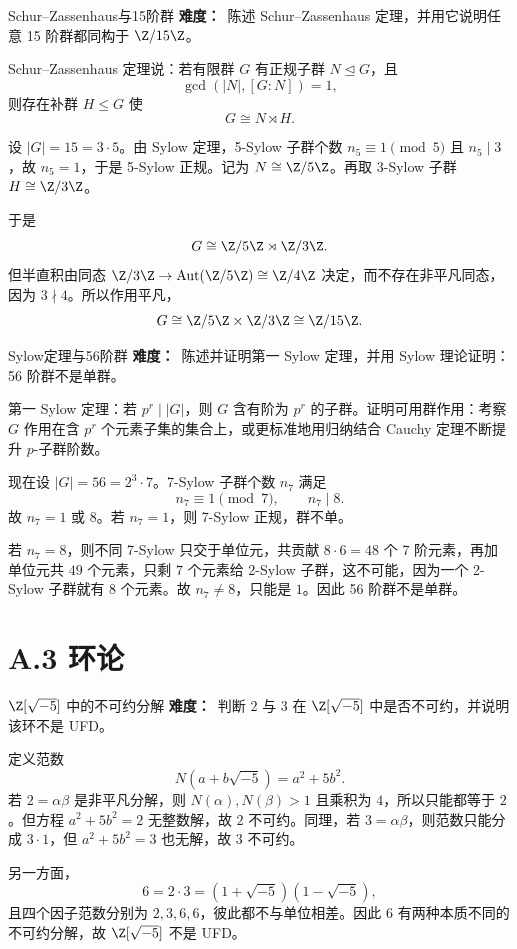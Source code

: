 \begin{problem}{Schur--Zassenhaus与15阶群}
\textbf{难度：}\hard\ 陈述 Schur--Zassenhaus 定理，并用它说明任意 15 阶群都同构于 $\Z/15\Z$。
\end{problem}
\begin{solution}
Schur--Zassenhaus 定理说：若有限群 $G$ 有正规子群 $N\trianglelefteq G$，且
\[
\gcd(|N|,[G:N])=1,
\]
则存在补群 $H\le G$ 使
\[
G\cong N\rtimes H.
\]

设 $|G|=15=3\cdot5$。由 Sylow 定理，5-Sylow 子群个数 $n_5\equiv1\pmod5$ 且 $n_5\mid3$，故 $n_5=1$，于是 5-Sylow 正规。记为 $N\cong\Z/5\Z$。再取 3-Sylow 子群 $H\cong\Z/3\Z$。

于是
\[
G\cong \Z/5\Z\rtimes \Z/3\Z.
\]
但半直积由同态 $\Z/3\Z\to \operatorname{Aut}(\Z/5\Z)\cong\Z/4\Z$ 决定，而不存在非平凡同态，因为 $3\nmid4$。所以作用平凡，
\[
G\cong \Z/5\Z\times\Z/3\Z\cong \Z/15\Z.
\]
\end{solution}

\begin{problem}{Sylow定理与56阶群}
\textbf{难度：}\hard\ 陈述并证明第一 Sylow 定理，并用 Sylow 理论证明：56 阶群不是单群。
\end{problem}
\begin{solution}
第一 Sylow 定理：若 $p^r\mid |G|$，则 $G$ 含有阶为 $p^r$ 的子群。证明可用群作用：考察 $G$ 作用在含 $p^r$ 个元素子集的集合上，或更标准地用归纳结合 Cauchy 定理不断提升 $p$-子群阶数。

现在设 $|G|=56=2^3\cdot7$。7-Sylow 子群个数 $n_7$ 满足
\[
n_7\equiv1\pmod7,\qquad n_7\mid8.
\]
故 $n_7=1$ 或 $8$。若 $n_7=1$，则 7-Sylow 正规，群不单。

若 $n_7=8$，则不同 7-Sylow 只交于单位元，共贡献 $8\cdot6=48$ 个 7 阶元素，再加单位元共 $49$ 个元素，只剩 $7$ 个元素给 2-Sylow 子群，这不可能，因为一个 2-Sylow 子群就有 $8$ 个元素。故 $n_7\neq8$，只能是 $1$。因此 56 阶群不是单群。
\end{solution}

\section{A.3 环论}

\begin{problem}{$\Z[\sqrt{-5}]$ 中的不可约分解}
\textbf{难度：}\easy\ 判断 $2$ 与 $3$ 在 $\Z[\sqrt{-5}]$ 中是否不可约，并说明该环不是 UFD。
\end{problem}
\begin{solution}
定义范数
\[
N(a+b\sqrt{-5})=a^2+5b^2.
\]
若 $2=\alpha\beta$ 是非平凡分解，则 $N(\alpha),N(\beta)>1$ 且乘积为 $4$，所以只能都等于 $2$。但方程 $a^2+5b^2=2$ 无整数解，故 $2$ 不可约。同理，若 $3=\alpha\beta$，则范数只能分成 $3\cdot1$，但 $a^2+5b^2=3$ 也无解，故 $3$ 不可约。

另一方面，
\[
6=2\cdot3=(1+\sqrt{-5})(1-\sqrt{-5}),
\]
且四个因子范数分别为 $2,3,6,6$，彼此都不与单位相差。因此 $6$ 有两种本质不同的不可约分解，故 $\Z[\sqrt{-5}]$ 不是 UFD。
\end{solution}

